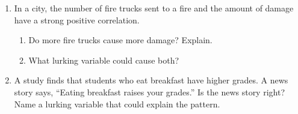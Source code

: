 \documentclass[11pt]{article}
\begin{document}
\begin{enumerate}
\begin{enumerate}[itemsep=3.2em]
  \item A scatterplot has $r = 1.3$.

  \item $r = 0$ means there is no linear pattern.

\end{enumerate}
\work{2em}

\item In a city, the number of fire trucks sent to a fire and the amount of damage have a strong positive correlation.
\begin{enumerate}[itemsep=1em]
  \item Do more fire trucks cause more damage? Explain.

  \work{2em}
  \item What lurking variable could cause both?

\end{enumerate}
\work{2em}

\item A study finds that students who eat breakfast have higher grades. A news story says, ``Eating breakfast raises your grades.''
Is the news story right? Name a lurking variable that could explain the pattern.


\end{enumerate}
\end{document}
